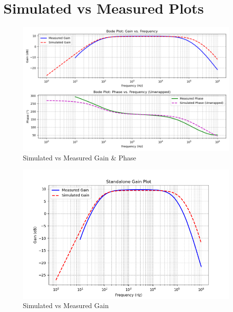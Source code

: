 \section{Simulated vs Measured Plots}
\begin{figure}[H]
	\centering
	\includegraphics[width=1.0\linewidth]{Chapter_5/Lab_05_Bode_Sim_Vs_Meas_Gain_Phase.png}
	\caption{Simulated vs Measured Gain \& Phase}
	\label{Ch5_fig:3}
\end{figure}

\begin{figure}[H]
	\centering
	\includegraphics[width=1.0\linewidth]{Chapter_5/Lab_05_Sim_Vs_Meas_Gain.png}
	\caption{Simulated vs Measured Gain}
	\label{Ch5_fig:4}
\end{figure}

